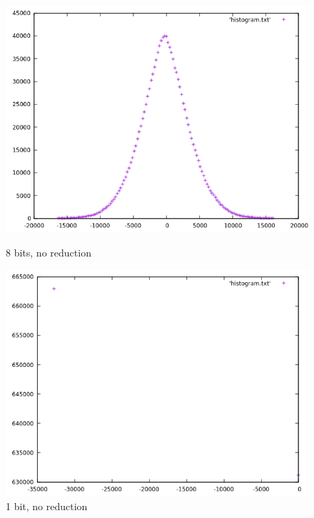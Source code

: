 \documentclass[12pt]{article}
\begin{document}
\begin{figure}[H]
  \begin{minipage}{.5\textwidth}
    \centering
    \includegraphics[width=\linewidth]{sample01_8_1.png}
    \caption{{8 bits, no reduction}}
    \label{fig:8_no}
  \end{minipage}
  \begin{minipage}{.5\textwidth}
    \centering
    \includegraphics[width=\linewidth]{sample01_1_1.png}
    \caption{{1 bit, no reduction}}
    \label{fig:1_no}
  \end{minipage}
  \begin{minipage}{.5\textwidth}
    \centering

\end{minipage}
\end{figure}
\end{document}
